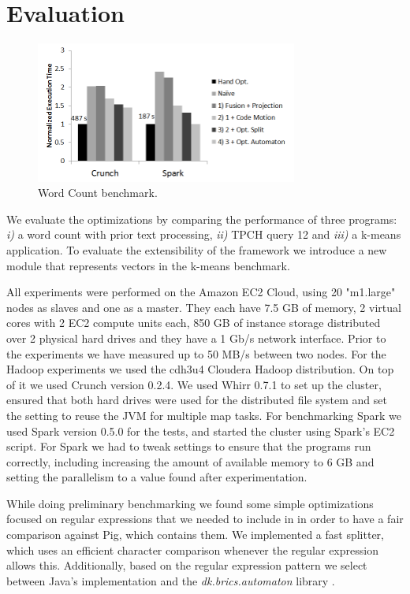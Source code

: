 \section{Evaluation}
\label{sec:evaluation}
\begin{figure}[t]
    \includegraphics[width=8.6cm]{figures/word-count.png}
   \caption{Word Count benchmark.}
   \label{fig:word-count}%
\end{figure}
We evaluate the optimizations by comparing the performance of three
programs:
\emph{i)} a word count with prior text processing, \emph{ii)} TPCH \cite{tpch}
query 12 and \emph{iii)} a k-means application. To evaluate the extensibility
of the framework we introduce a new \tool module that represents
vectors in the k-means benchmark.

All experiments were performed on the Amazon EC2 Cloud, using 20 "m1.large"
nodes as slaves and one as a master. They each have 7.5 GB of memory, 2 virtual
cores with 2 EC2 compute units each, 850 GB of instance storage distributed over
2 physical hard drives and they have a 1 Gb/s network interface. Prior to the
experiments we have measured up to 50 MB/s between two nodes. For the Hadoop
experiments we used the cdh3u4 Cloudera Hadoop distribution. On top of it we
used Crunch version 0.2.4. We used Whirr 0.7.1 \cite{whirr} to
set up the cluster, ensured that both hard drives were used for the
distributed file system and set the setting to reuse the JVM for
multiple map tasks.
For benchmarking Spark we used Spark version 0.5.0 for the tests, and
started the cluster using Spark's EC2 script.
For Spark we had to tweak settings to ensure that the programs run
correctly, including increasing the amount of available memory to 6 GB and
setting the parallelism to a value found after experimentation.

While doing preliminary benchmarking we found some simple optimizations focused
on regular expressions that we needed to include in \tool in order to have a fair
comparison against Pig, which contains them. We implemented a fast splitter,
which uses an efficient character comparison whenever the regular expression
allows this. Additionally, based on the regular expression pattern we select
between Java's implementation and the \emph{dk.brics.automaton} library \cite{mollerdk}.

